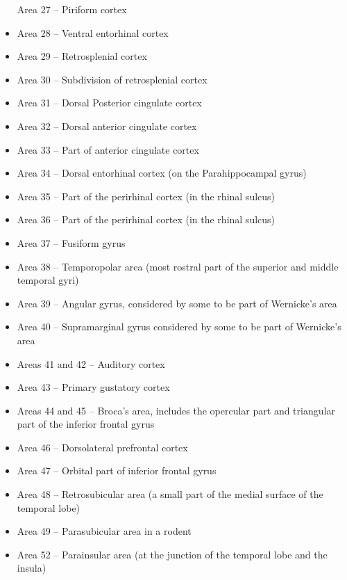 \begin{itemize}
  Area 27 -- Piriform cortex
\item
  Area 28 -- Ventral entorhinal cortex
\item
  Area 29 -- Retrosplenial cortex
\item
  Area 30 -- Subdivision of retrosplenial cortex
\item
  Area 31 -- Dorsal Posterior cingulate cortex
\item
  Area 32 -- Dorsal anterior cingulate cortex
\item
  Area 33 -- Part of anterior cingulate cortex
\item
  Area 34 -- Dorsal entorhinal cortex (on the Parahippocampal gyrus)
\item
  Area 35 -- Part of the perirhinal cortex (in the rhinal sulcus)
\item
  Area 36 -- Part of the perirhinal cortex (in the rhinal sulcus)
\item
  Area 37 -- Fusiform gyrus
\item
  Area 38 -- Temporopolar area (most rostral part of the superior and middle temporal gyri)
\item
  Area 39 -- Angular gyrus, considered by some to be part of Wernicke's area
\item
  Area 40 -- Supramarginal gyrus considered by some to be part of Wernicke's area
\item
  Areas 41 and 42 -- Auditory cortex
\item
  Area 43 -- Primary gustatory cortex
\item
  Areas 44 and 45 -- Broca's area, includes the opercular part and triangular part of the inferior frontal gyrus
\item
  Area 46 -- Dorsolateral prefrontal cortex
\item
  Area 47 -- Orbital part of inferior frontal gyrus
\item
  Area 48 -- Retrosubicular area (a small part of the medial surface of the temporal lobe)
\item
  Area 49 -- Parasubicular area in a rodent
\item
  Area 52 -- Parainsular area (at the junction of the temporal lobe and the insula)
\end{itemize}


